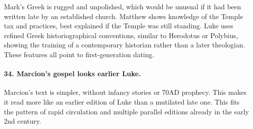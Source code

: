 Mark’s Greek is rugged and unpolished, which would be unusual if it had been written late by an established church.
Matthew shows knowledge of the Temple tax and practices, best explained if the Temple was still standing.
Luke uses refined Greek historiographical conventions, similar to Herodotus or Polybius, showing the training of a contemporary historian rather than a later theologian.
These features all point to first-generation dating.

\paragraph{34.
Marcion’s gospel looks earlier Luke.}\label{par:marcions-gospel-looks-earlier-luke.}

Marcion’s text is simpler, without infancy stories or 70AD prophecy.
This makes it read more like an earlier edition of Luke than a mutilated late one.
This fits the pattern of rapid circulation and multiple parallel editions already in the early 2nd century.
